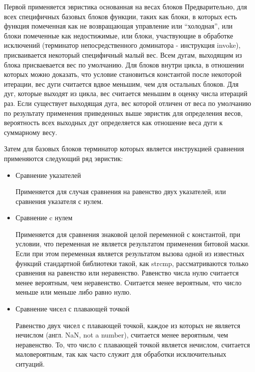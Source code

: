 Первой применяется эвристика основанная на весах блоков
Предварительно, для всех специфичных базовых блоков функции, таких как блоки, в которых есть функция помеченная как не возвращающая управление или \enquote{холодная}, или блоки помеченные как недостижимые, или блоки, участвующие в обработке исключений (терминатор непосредственного доминатора - инструкция invoke), присваивается некоторый специфичный малый вес.
Всем дугам, выходящим из блока присваевается вес по умолчанию.
Для блоков внутри цикла, в отношении которых можно доказать, что условие становиться константой после некоторой итерации, вес дуги считается вдвое меньшим, чем для остальных блоков.
Для дуг, которые выходят из цикла, вес считается меньшим в оценку числа итераций раз.
Если существует выходящая дуга, вес которой отличен от веса по умолчанию по результату применения приведенных выше эвристик для определения весов, вероятность всех выходных дуг определяется как отношение веса дуги к суммарному весу.

Затем для базовых блоков терминатор которых является инструкцией сравнения применяются следующий ряд эвристик:
\begin{itemize}
    \item Сравнение указателей

        Применяется для случая сравнения на равенство двух указателей, или сравнения указателя с нулем.

    \item Сравнение c нулем

        Применяется для сравнения знаковой целой переменной с константой, при условии, что переменная не является результатом применения битовой маски.
        Если при этом переменная является результатом вызова одной из известных функций стандартной библиотеки такой, как strcmp, рассматриваются только сравнения на равенство или неравенство.
        Равенство числа нулю считается менее вероятным, чем неравенство.
        Считается менее вероятным, что число меньше или меньше либо равно нулю.

    \item Сравнение чисел с плавающей точкой

        Равенство двух чисел с плавающей точкой, каждое из которых не является нечислом (англ. NaN, not a number), считается менее вероятным, чем неравенство.
        То, что число с плавающей точкой является нечислом, считается маловероятным, так как часто служит для обработки исключительных ситуаций.

\end{itemize}

